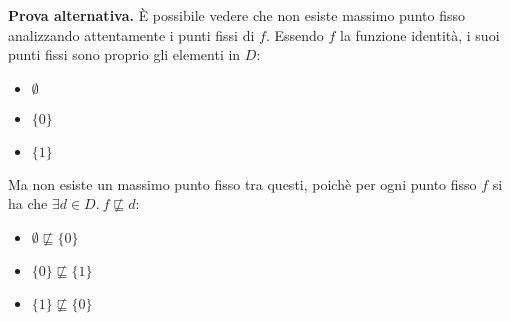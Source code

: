 \textbf{Prova alternativa.} È possibile vedere che non esiste massimo
punto fisso analizzando attentamente i punti fissi di $f$. Essendo $f$ la
funzione identità, i suoi punti fissi sono proprio gli elementi in $D$:
\begin{itemize}
  \item $\emptyset$
  \item $\{0\}$
  \item $\{1\}$
\end{itemize}
Ma non esiste un massimo punto fisso tra questi, poichè per ogni punto fisso
$f$ si ha che $\exists{d}\in{D}.\ f \not\sqsubseteq d$:
\begin{itemize}
  \item $\emptyset \not\sqsubseteq \{0\}$
  \item $\{0\} \not\sqsubseteq \{1\}$
  \item $\{1\} \not\sqsubseteq \{0\}$
\end{itemize}
\cvd
